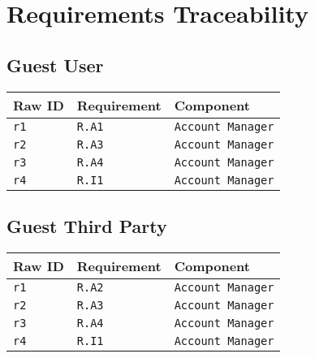 \documentclass[../DD0.tex]{subfiles}
\begin{document}
\section{Requirements Traceability}
\label{sec:req}

\subsection{Guest User}

    \begin{table}[h!]

      \centering
      \begin{tabularx}{.8\linewidth}{|X|X|X|}
        \hline
        \textbf{Raw ID} & \textbf{Requirement} & \textbf{Component} \\ \hline
        \texttt{r1} & \texttt{R.A1} & \texttt{Account Manager} \\
        \hline
        \texttt{r2} & \texttt{R.A3} & \texttt{Account Manager} \\
        \hline
        \texttt{r3} & \texttt{R.A4} & \texttt{Account Manager} \\
        \hline
        \texttt{r4} & \texttt{R.I1}  & \texttt{Account Manager} \\
        \hline
      \end{tabularx}
      \label{tab:guestuser}

    \end{table}


\subsection{Guest Third Party}

    \begin{table}[h!]

      \centering
      \begin{tabularx}{.8\linewidth}{|X|X|X|}
        \hline
        \textbf{Raw ID} & \textbf{Requirement} & \textbf{Component} \\ \hline
        \texttt{r1} & \texttt{R.A2} & \texttt{Account Manager} \\
        \hline
        \texttt{r2} & \texttt{R.A3} & \texttt{Account Manager} \\
        \hline
        \texttt{r3} & \texttt{R.A4} & \texttt{Account Manager} \\
        \hline
        \texttt{r4} & \texttt{R.I1}  & \texttt{Account Manager} \\
        \hline
       
      \end{tabularx}
      \label{tab:guesttp}

    \end{table}
\end{document}
